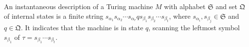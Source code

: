 An instantaneous description of a Turing machine $M$ with alphabet $\mathfrak{S}$ and set $\mathfrak{Q}$ of internal states is a finite string $s_{\alpha_1} s_{\alpha_2} \cdots s_{\alpha_r} q s_{\beta_1} s_{\beta_2} \cdots s_{\beta_t}$, where $s_{\alpha_i}, s_{\beta_j} \in \mathfrak{S}$ and $q \in \mathfrak{Q}$. It indicates that the machine is in state $q$, scanning the leftmost symbol $s_{\beta_1}$ of $\tau = s_{\beta_1} \cdots s_{\beta_t}$.
